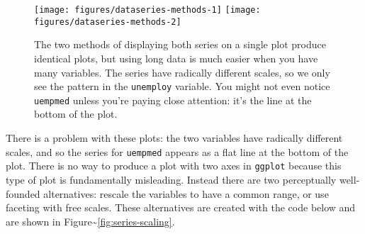 \begin{Shaded}
\begin{Highlighting}[]
\StringTok{ }
\StringTok{  }\NormalTok{(}\NormalTok{(}  \NormalTok{)) +}\StringTok{ }
\StringTok{  }\NormalTok{(}\NormalTok{(}  \NormalTok{)) +}\StringTok{ }
\StringTok{  }\NormalTok{(}\NormalTok{)}

\StringTok{ }
  \NormalTok{, } 
\end{Highlighting}
\end{Shaded}

\begin{figure}

{\centering \texttt{[image: figures/dataseries-methods-1]} \texttt{[image: figures/dataseries-methods-2]} 

}

\caption{The two methods of displaying both series on a single plot produce identical plots, but using long data is much easier when you have many variables.  The series have radically different scales, so we only see the pattern in the \texttt{unemploy} variable. You might not even notice \texttt{uempmed} unless you're paying close attention: it's the line at the bottom of the plot.\label{fig:series-methods}}
\end{figure}

There is a problem with these plots: the two variables have radically
different scales, and so the series for \texttt{uempmed} appears as a
flat line at the bottom of the plot. There is no way to produce a plot
with two axes in \texttt{ggplot} because this type of plot is
fundamentally misleading. Instead there are two perceptually
well-founded alternatives: rescale the variables to have a common range,
or use faceting with free scales. These alternatives are created with
the code below and are shown in
Figure\textasciitilde{}\ref{fig:series-scaling}. 


